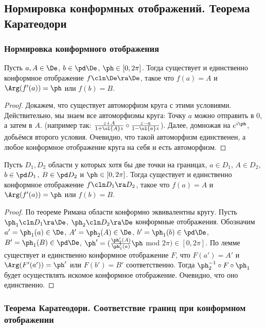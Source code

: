 \documentclass[a4paper]{article}
\begin{document}
\subsection{Нормировка конформных отображений. Теорема Каратеодори}

\subsubsection{Нормировка конформного отображения}

\begin{lemma}
Пусть $a,A\in\De$, $b\in\pd\De$, $\ph\in[0,2\pi]$.
Тогда существует и единственно конформное отображение $f\cln\De\ra\De$, такое что $f(a) = A$ и  $\Arg(f'(a))=\ph$ или $f(b)=B$.
\end{lemma}
\begin{proof}
Докажем, что существует автоморфизм круга с этими условиями. Действительно, мы знаем все автоморфизмы круга:
Точку $a$ можно отправить в $0$, а затем в $A$. (например так: $\frac{z+A}{1+\ol{A}z}\circ\frac{z-a}{1-\ol{a}z}$).
Далее, домножая на $e^{i\ph}$, добьёмся второго условия. Очевидно, что такой автоморфизм единственен, а любое
конформное отображение круга на себя и есть автоморфизм.
\end{proof}

\begin{theorem}
Пусть $D_1,D_2$ \т области у которых хотя бы две точки на границах, $a\in D_1$, $A\in D_2$, $b\in\pd D_1$, $B\in\pd D_2$ и $\ph\in[0,2\pi]$. Тогда существует и единственно конформное отображение $f\cln D_1 \ra D_2$, такое что $f(a) = A$ и  $\Arg(f'(a))=\ph$ или $f(b)=B$.
\end{theorem}
\begin{proof}
По теореме Римана области конформно эквивалентны кругу. Пусть $\ph_1\cln D_1 \ra \De$, $\ph_2\cln D_2 \ra \De$ \т конформные отображения. Обозначим $a'=\ph_1(a)\in \De$, $A'=\ph_2(A)\in \De$, $b'=\ph_1(b)\in\pd \De$, $B'=\ph_1(B)\in\pd \De$, $\ph'=(\frac{\ph'_2(A)}{\ph'_1(a)}\ph$ mod $2\pi) \in[0,2\pi]$. По лемме существует и единственно конформное отображение $F$, что $F(a') = A'$ и  $\Arg(F'(a'))=\ph'$ или $F(b')=B'$ соответственно. Тогда $\ph_2^{-1}\circ F\circ \ph_1$ будет осуществлять искомое конформное отображение. Очевидно, что оно единственно.
\end{proof}


\subsubsection{Теорема Каратеодори. Соответствие границ при конформном отображении}
\end{document}
